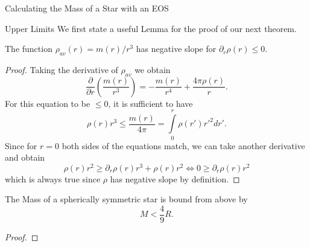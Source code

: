 \begin{section}{Calculating the Mass of a Star with an EOS}
\begin{subsection}{Upper Limits}
We first state a useful Lemma for the proof of our next theorem.
\begin{lemma}
	The function $\rho_{av}(r)=m(r)/r^3$ has negative slope for $\partial_r\rho(r)\leq0$.
\end{lemma}
\begin{proof}
	Taking the derivative of $\rho_{av}$ we obtain 
	\begin{equation}
		\frac{\partial}{\partial r}\left(\frac{m(r)}{r^3}\right) = -\frac{m(r)}{r^4} + \frac{4\pi\rho(r)}{r}.
	\end{equation}
	For this equation to be $\leq0$, it is sufficient to have
	\begin{equation}
		\rho(r)r^3\leq\frac{m(r)}{4\pi}=\int\limits_0^r\rho(r')r'^2dr'.
	\end{equation}
	Since for $r=0$ both sides of the equations match, we can take another derivative and obtain 
	\begin{equation}
		\rho(r)r^2\geq\partial_r\rho(r)r^3+\rho(r)r^2 \Leftrightarrow 0 \geq \partial_r\rho(r)r^2
	\end{equation}
	which is always true since $\rho$ has negative slope by definition.
\end{proof}\noindent
\begin{theorem}
	The Mass of a spherically symmetric star is bound from above by
	\begin{equation}
		M < \frac{4}{9}R.
	\end{equation}
\end{theorem}
\begin{proof}

\end{proof}
\end{subsection}
\end{section}

